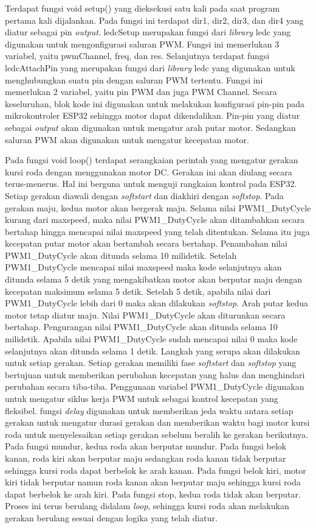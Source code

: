 Terdapat fungsi void setup() yang dieksekusi satu kali pada saat program pertama kali dijalankan. Pada fungsi ini terdapat dir1, dir2, dir3, dan dir4 yang diatur sebagai pin \emph{output}. ledcSetup merupakan fungsi dari \emph{library} ledc yang digunakan untuk mengonfigurasi saluran PWM. Fungsi ini memerlukan 3 variabel, yaitu pwmChannel, freq, dan res. Selanjutnya terdapat fungsi ledcAttachPin yang merupakan fungsi dari \emph{library} ledc yang digunakan untuk menghubungkan suatu pin dengan saluran PWM tertentu. Fungsi ini memerlukan 2 variabel, yaitu pin PWM dan juga PWM Channel. Secara keseluruhan, blok kode ini digunakan untuk melakukan konfigurasi pin-pin pada mikrokontroler ESP32 sehingga motor dapat dikendalikan. Pin-pin yang diatur sebagai \emph{output} akan digunakan untuk mengatur arah putar motor. Sedangkan saluran PWM akan digunakan untuk mengatur kecepatan motor.

Pada fungsi void loop() terdapat serangkaian perintah yang mengatur gerakan kursi roda dengan menggunakan motor DC. Gerakan ini akan diulang secara terus-menerus. Hal ini berguna untuk menguji rangkaian kontrol pada ESP32. Setiap gerakan diawali dengan \emph{softstart} dan diakhiri dengan \emph{softstop}. Pada gerakan maju, kedua motor akan bergerak maju. Selama nilai PWM1\_DutyCycle kurang dari maxspeed, maka nilai PWM1\_DutyCycle akan ditambahkan secara bertahap hingga mencapai nilai maxspeed yang telah ditentukan. Selama itu juga kecepatan putar motor akan bertambah secara bertahap. Penambahan nilai PWM1\_DutyCycle akan ditunda selama 10 milidetik. Setelah PWM1\_DutyCycle mencapai nilai maxspeed maka kode selanjutnya akan ditunda selama 5 detik yang mengakibatkan motor akan berputar maju dengan kecepatan maksimum selama 5 detik. Setelah 5 detik, apabila nilai dari PWM1\_DutyCycle lebih dari 0 maka akan dilakukan \emph{softstop}. Arah putar kedua motor tetap diatur maju. Nilai PWM1\_DutyCycle akan diturunkan secara bertahap. Pengurangan nilai PWM1\_DutyCycle akan ditunda selama 10 milidetik. Apabila nilai PWM1\_DutyCycle sudah mencapai nilai 0 maka kode selanjutnya akan ditunda selama 1 detik. Langkah yang serupa akan dilakukan untuk setiap gerakan. Setiap gerakan memiliki fase \emph{softstart} dan \emph{softstop} yang bertujuan untuk memberikan perubahan kecepatan yang halus dan menghindari perubahan secara tiba-tiba. Penggunaan variabel PWM1\_DutyCycle digunakan untuk mengatur siklus kerja PWM untuk sebagai kontrol kecepatan yang fleksibel. fungsi \emph{delay} digunakan untuk memberikan jeda waktu antara setiap gerakan untuk mengatur durasi gerakan dan memberikan waktu bagi motor kursi roda untuk menyelesaikan setiap gerakan sebelum beralih ke gerakan berikutnya. Pada fungsi mundur, kedua roda akan berputar mundur. Pada fungsi belok kanan, roda kiri akan berputar maju sedangkan roda kanan tidak berputar sehingga kursi roda dapat berbelok ke arah kanan. Pada fungsi belok kiri, motor kiri tidak berputar namun roda kanan akan berputar maju sehingga kursi roda dapat berbelok ke arah kiri. Pada fungsi stop, kedua roda tidak akan berputar. Proses ini terus berulang didalam \emph{loop}, sehingga kursi roda akan melakukan gerakan berulang sesuai dengan logika yang telah diatur.



